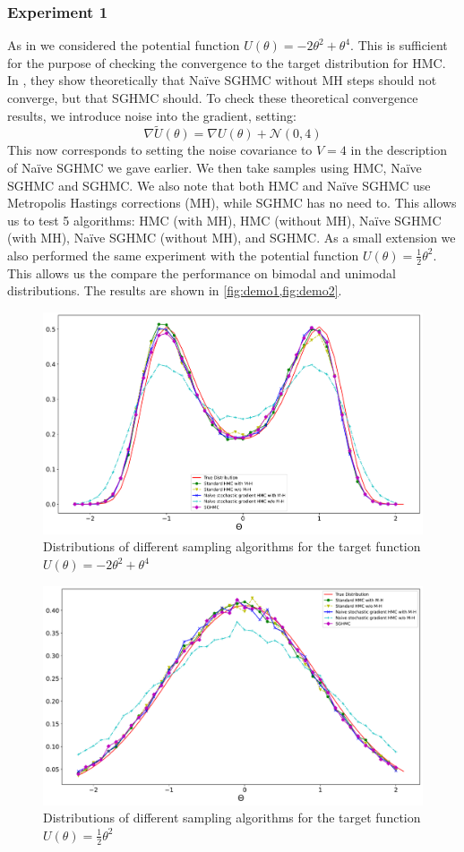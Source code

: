\subsubsection*{Experiment 1}
As in \cite{sghmc} we considered the potential function $U(\theta) = -2\theta^2 + \theta^4$. This is sufficient for the purpose of checking the convergence to the target distribution for HMC. In \cite{sghmc}, they show theoretically that Naïve SGHMC without MH steps should not converge, but that SGHMC should.  To check these theoretical convergence results, we introduce noise into the gradient, setting:
$$\nabla \widetilde{U}(\theta) = \nabla U(\theta) + \mathcal{N}(0,4)$$
This now corresponds to setting the noise covariance to $V=4$ in the description of Naïve SGHMC we gave earlier. We then take samples using HMC, Naïve SGHMC and SGHMC. We also note that both HMC and Naïve SGHMC use Metropolis Hastings corrections (MH), while SGHMC has no need to. This allows us to test 5 algorithms: HMC (with MH), HMC (without MH), Naïve SGHMC (with MH), Naïve SGHMC (without MH), and SGHMC. As a small extension we also performed the same experiment with the potential function $U(\theta) = \frac 1 2\theta^2$. This allows us the compare the performance on bimodal and unimodal distributions. The results are shown in \cref{fig:demo1,fig:demo2}.
\begin{figure}[h!]
  \includegraphics[width=.9\linewidth]{parts/Images/fig1a.pdf}
  \caption{Distributions of different sampling algorithms for the target function $U(\theta) = -2\theta^2 + \theta^4$}
  \label{fig1a}
  \label{fig:demo1}
\end{figure}
\begin{figure}[h!]
  \includegraphics[width=.9\linewidth]{parts/Images/fig1b.pdf}
  \caption{Distributions of different sampling algorithms for the target function $U(\theta) = \frac{1}{2}\theta^2$}
  \label{fig:demo2}
\end{figure}
